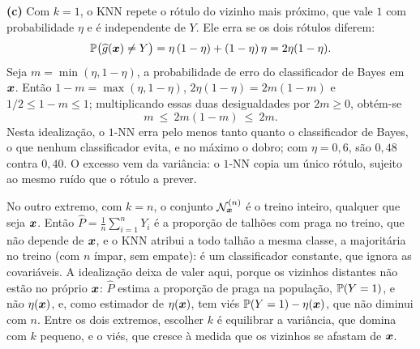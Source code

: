 \begin{solucao}
\smallskip
\textbf{(c)} Com $k=1$, o KNN repete o rótulo do vizinho mais próximo, que vale $1$ com
probabilidade $\eta$ e é independente de $Y$. Ele erra se os dois rótulos diferem:
\[
  \mathbb{P}\big(\widehat{g}(\bm{x})\ne Y\big)=\eta\,(1-\eta)+(1-\eta)\,\eta=2\eta(1-\eta) .
\]
Seja $m=\min(\eta,1-\eta)$, a probabilidade de erro do classificador de Bayes em $\bm{x}$. Então
$1-m=\max(\eta,1-\eta)$, $2\eta(1-\eta)=2m(1-m)$ e $1/2\le1-m\le1$; multiplicando essas duas
desigualdades por $2m\ge0$, obtém-se
\[
  m\ \le\ 2m(1-m)\ \le\ 2m .
\]
Nesta idealização, o $1$-NN erra pelo menos tanto quanto o classificador de Bayes, o que
nenhum classificador evita, e no máximo o dobro; com $\eta=0{,}6$, são $0{,}48$ contra $0{,}40$.
O excesso vem da variância: o $1$-NN copia um único rótulo, sujeito ao mesmo ruído que o rótulo
a prever.

No outro extremo, com $k=n$, o conjunto $\mathcal{N}_{\bm{x}}^{(n)}$ é o treino inteiro, qualquer que
seja $\bm{x}$. Então $\widehat P=\frac1n\sum_{i=1}^nY_i$ é a proporção de talhões com praga no
treino, que não depende de $\bm{x}$, e o KNN atribui a todo talhão a mesma classe, a majoritária no
treino (com $n$ ímpar, sem empate): é um classificador constante, que ignora as covariáveis. A
idealização deixa de valer aqui, porque os vizinhos distantes não estão no próprio $\bm{x}$:
$\widehat P$ estima a proporção de praga na população, $\mathbb{P}(Y=1)$, e não $\eta(\bm{x})$, e, como
estimador de $\eta(\bm{x})$, tem viés $\mathbb{P}(Y=1)-\eta(\bm{x})$, que não diminui com $n$. Entre os dois
extremos, escolher $k$ é equilibrar a variância, que domina com $k$ pequeno, e o viés, que
cresce à medida que os vizinhos se afastam de $\bm{x}$.
\end{solucao}
